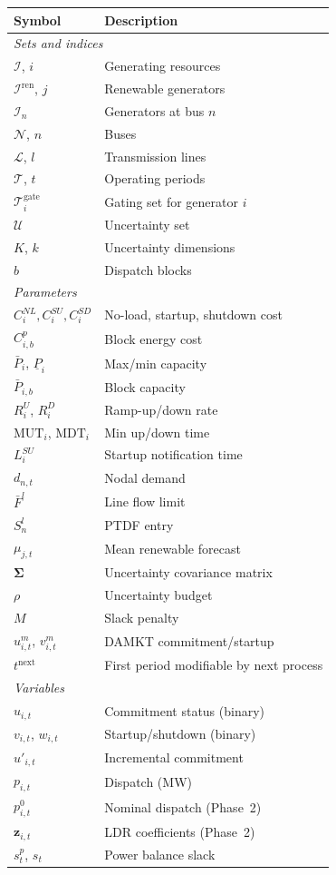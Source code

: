 \documentclass[journal]{IEEEtran}
\begin{document}
\begin{table}[h]
\renewcommand{\arraystretch}{1.15}
\centering
\begin{tabular}{ll}
\hline
\textbf{Symbol} & \textbf{Description} \\
\hline
\multicolumn{2}{l}{\emph{Sets and indices}} \\
$\mathcal{I}$, $i$ & Generating resources \\
$\mathcal{I}^{\text{ren}}$, $j$ & Renewable generators \\
$\mathcal{I}_n$ & Generators at bus $n$ \\
$\mathcal{N}$, $n$ & Buses \\
$\mathcal{L}$, $l$ & Transmission lines \\
$\mathcal{T}$, $t$ & Operating periods \\
$\mathcal{T}_i^{\text{gate}}$ & Gating set for generator $i$ \\
$\mathcal{U}$ & Uncertainty set \\
$K$, $k$ & Uncertainty dimensions \\
$b$ & Dispatch blocks \\
\hline
\multicolumn{2}{l}{\emph{Parameters}} \\
$C_i^{NL},C_i^{SU},C_i^{SD}$ & No-load, startup, shutdown cost \\
$C_{i,b}^p$ & Block energy cost \\
$\bar{P}_i$, $\underline{P}_i$ & Max/min capacity \\
$\bar{P}_{i,b}$ & Block capacity \\
$R_i^U$, $R_i^D$ & Ramp-up/down rate \\
$\text{MUT}_i$, $\text{MDT}_i$ & Min up/down time \\
$L_i^{SU}$ & Startup notification time \\
$d_{n,t}$ & Nodal demand \\
$\bar{F}^l$ & Line flow limit \\
$S_n^l$ & PTDF entry \\
$\mu_{j,t}$ & Mean renewable forecast \\
$\boldsymbol{\Sigma}$ & Uncertainty covariance matrix \\
$\rho$ & Uncertainty budget \\
$M$ & Slack penalty \\
$u_{i,t}^m$, $v_{i,t}^m$ & DAMKT commitment/startup \\
$t^{\text{next}}$ & First period modifiable by next process \\
\hline
\multicolumn{2}{l}{\emph{Variables}} \\
$u_{i,t}$ & Commitment status (binary) \\
$v_{i,t}$, $w_{i,t}$ & Startup/shutdown (binary) \\
$u'_{i,t}$ & Incremental commitment \\
$p_{i,t}$ & Dispatch (MW) \\
$p_{i,t}^0$ & Nominal dispatch (Phase~2) \\
$\mathbf{z}_{i,t}$ & LDR coefficients (Phase~2) \\
$s_t^p$, $s_t$ & Power balance slack \\
\hline
\end{tabular}
\end{table}
\end{document}
